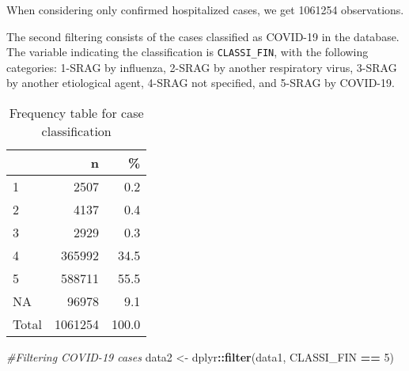 \documentclass[
]{article}
\newenvironment{Shaded}{\begin{snugshade}}{\end{snugshade}}
\newcommand{\CommentTok}[1]{\textcolor[rgb]{0.56,0.35,0.01}{\textit{#1}}}
\newcommand{\DataTypeTok}[1]{\textcolor[rgb]{0.13,0.29,0.53}{#1}}
\newcommand{\DecValTok}[1]{\textcolor[rgb]{0.00,0.00,0.81}{#1}}
\newcommand{\KeywordTok}[1]{\textcolor[rgb]{0.13,0.29,0.53}{\textbf{#1}}}
\newcommand{\NormalTok}[1]{#1}
\newcommand{\OperatorTok}[1]{\textcolor[rgb]{0.81,0.36,0.00}{\textbf{#1}}}
\newcommand{\OtherTok}[1]{\textcolor[rgb]{0.56,0.35,0.01}{#1}}
\newcommand{\StringTok}[1]{\textcolor[rgb]{0.31,0.60,0.02}{#1}}
\begin{document}
When considering only confirmed hospitalized cases, we get 1061254
observations.

The second filtering consists of the cases classified as COVID-19 in the
database. The variable indicating the classification is
\texttt{CLASSI\_FIN}, with the following categories: 1-SRAG by
influenza, 2-SRAG by another respiratory virus, 3-SRAG by another
etiological agent, 4-SRAG not specified, and 5-SRAG by COVID-19.

\begin{Shaded}
\end{Shaded}

\begin{table}[!h]

\caption{\label{tab:unnamed-chunk-9}Frequency table for case classification}
\centering
\begin{tabular}[t]{l|r|r}
\hline
  & n & \%\\
\hline
1 & 2507 & 0.2\\
\hline
2 & 4137 & 0.4\\
\hline
3 & 2929 & 0.3\\
\hline
4 & 365992 & 34.5\\
\hline
5 & 588711 & 55.5\\
\hline
NA & 96978 & 9.1\\
\hline
Total & 1061254 & 100.0\\
\hline
\end{tabular}
\end{table}

\begin{Shaded}
\begin{Highlighting}[]
\CommentTok{#Filtering COVID-19 cases}
\NormalTok{data2 <-}\StringTok{ }\NormalTok{dplyr}\OperatorTok{::}\KeywordTok{filter}\NormalTok{(data1, CLASSI_FIN }\OperatorTok{==}\StringTok{ }\DecValTok{5}\NormalTok{)}
\end{Highlighting}
\end{Shaded}
\end{document}
